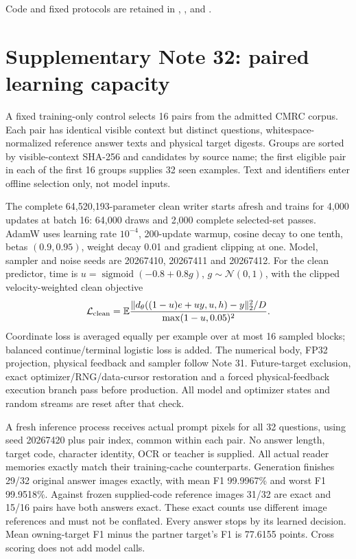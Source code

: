 \documentclass[10pt,a4paper]{article}
\begin{document}
Code and fixed protocols are retained in
,
,
 and
.

\section*{Supplementary Note 32: paired learning capacity}
A fixed training-only control selects 16 pairs from the admitted CMRC corpus.
Each pair has identical visible context but distinct questions, whitespace-
normalized reference answer texts and physical target digests. Groups are
sorted by visible-context SHA-256 and candidates by source name; the first
eligible pair in each of the first 16 groups supplies 32 seen examples.
Text and identifiers enter offline selection only, not model inputs.

The complete 64,520,193-parameter clean writer starts afresh and trains for
4,000 updates at batch 16: 64,000 draws and 2,000 complete selected-set passes.
AdamW uses learning rate $10^{-4}$, 200-update warmup, cosine decay to one
tenth, betas $(0.9,0.95)$, weight decay 0.01 and gradient clipping at one.
Model, sampler and noise seeds are 20267410, 20267411 and 20267412.
For the clean predictor, time is $u=\operatorname{sigmoid}(-0.8+0.8g)$,
$g\sim\mathcal N(0,1)$, with the clipped velocity-weighted clean objective
\begin{equation}
 \mathcal L_{\rm clean}=
 \mathbb E\frac{\|d_\theta((1-u)e+uy,u,h)-y\|_2^2/D}{\max(1-u,0.05)^2}.
\end{equation}
Coordinate loss is averaged equally per example over at most 16 sampled
blocks; balanced continue/terminal logistic loss is added. The numerical
body, FP32 projection, physical feedback and sampler follow Note 31.
Future-target exclusion, exact optimizer/RNG/data-cursor restoration and a
forced physical-feedback execution branch pass before production. All model
and optimizer states and random streams are reset after that check.

A fresh inference process receives actual prompt pixels for all 32 questions,
using seed 20267420 plus pair index, common within each pair. No answer
length, target code, character identity, OCR or teacher is supplied.
All actual reader memories exactly match their training-cache counterparts.
Generation finishes 29/32 original answer images exactly, with mean F1
99.9967\% and worst F1 99.9518\%. Against frozen supplied-code reference
images 31/32 are exact and 15/16 pairs have both answers exact. These exact
counts use different image references and must not be conflated. Every
answer stops by its learned decision. Mean owning-target F1 minus the
partner target's F1 is 77.6155 points. Cross scoring does not add model calls.
\end{document}
